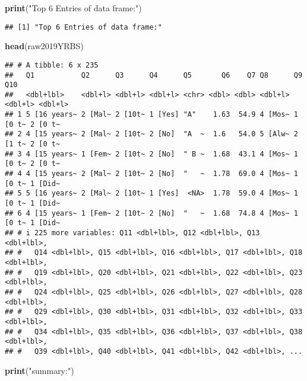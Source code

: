 \documentclass[
]{article}
\newenvironment{Shaded}{\begin{snugshade}}{\end{snugshade}}
\newcommand{\FunctionTok}[1]{\textcolor[rgb]{0.13,0.29,0.53}{\textbf{#1}}}
\newcommand{\NormalTok}[1]{#1}
\newcommand{\StringTok}[1]{\textcolor[rgb]{0.31,0.60,0.02}{#1}}
\begin{document}
\begin{Shaded}
\begin{Highlighting}[]
\FunctionTok{print}\NormalTok{(}\StringTok{"Top 6 Entries of data frame:"}\NormalTok{)}
\end{Highlighting}
\end{Shaded}

\begin{verbatim}
## [1] "Top 6 Entries of data frame:"
\end{verbatim}

\begin{Shaded}
\begin{Highlighting}[]
\FunctionTok{head}\NormalTok{(raw2019YRBS)}
\end{Highlighting}
\end{Shaded}

\begin{verbatim}
## # A tibble: 6 x 235
##   Q1           Q2      Q3      Q4      Q5       Q6    Q7 Q8      Q9      Q10    
##   <dbl+lbl>    <dbl+l> <dbl+l> <dbl+l> <chr> <dbl> <dbl> <dbl+l> <dbl+l> <dbl+l>
## 1 5 [16 years~ 2 [Mal~ 2 [10t~ 1 [Yes] "A"    1.63  54.9 4 [Mos~ 1 [0 t~ 2 [0 t~
## 2 4 [15 years~ 2 [Mal~ 2 [10t~ 2 [No]  "A  ~  1.6   54.0 5 [Alw~ 2 [1 t~ 2 [0 t~
## 3 4 [15 years~ 1 [Fem~ 2 [10t~ 2 [No]  " B ~  1.68  43.1 4 [Mos~ 1 [0 t~ 2 [0 t~
## 4 4 [15 years~ 2 [Mal~ 2 [10t~ 2 [No]  "   ~  1.78  69.0 4 [Mos~ 1 [0 t~ 1 [Did~
## 5 5 [16 years~ 2 [Mal~ 2 [10t~ 1 [Yes]  <NA>  1.78  59.0 4 [Mos~ 1 [0 t~ 1 [Did~
## 6 4 [15 years~ 1 [Fem~ 2 [10t~ 2 [No]  "   ~  1.68  74.8 4 [Mos~ 1 [0 t~ 1 [Did~
## # i 225 more variables: Q11 <dbl+lbl>, Q12 <dbl+lbl>, Q13 <dbl+lbl>,
## #   Q14 <dbl+lbl>, Q15 <dbl+lbl>, Q16 <dbl+lbl>, Q17 <dbl+lbl>, Q18 <dbl+lbl>,
## #   Q19 <dbl+lbl>, Q20 <dbl+lbl>, Q21 <dbl+lbl>, Q22 <dbl+lbl>, Q23 <dbl+lbl>,
## #   Q24 <dbl+lbl>, Q25 <dbl+lbl>, Q26 <dbl+lbl>, Q27 <dbl+lbl>, Q28 <dbl+lbl>,
## #   Q29 <dbl+lbl>, Q30 <dbl+lbl>, Q31 <dbl+lbl>, Q32 <dbl+lbl>, Q33 <dbl+lbl>,
## #   Q34 <dbl+lbl>, Q35 <dbl+lbl>, Q36 <dbl+lbl>, Q37 <dbl+lbl>, Q38 <dbl+lbl>,
## #   Q39 <dbl+lbl>, Q40 <dbl+lbl>, Q41 <dbl+lbl>, Q42 <dbl+lbl>, ...
\end{verbatim}

\begin{Shaded}
\begin{Highlighting}[]
\FunctionTok{print}\NormalTok{(}\StringTok{"summary:"}\NormalTok{)}
\end{Highlighting}
\end{Shaded}
\end{document}
